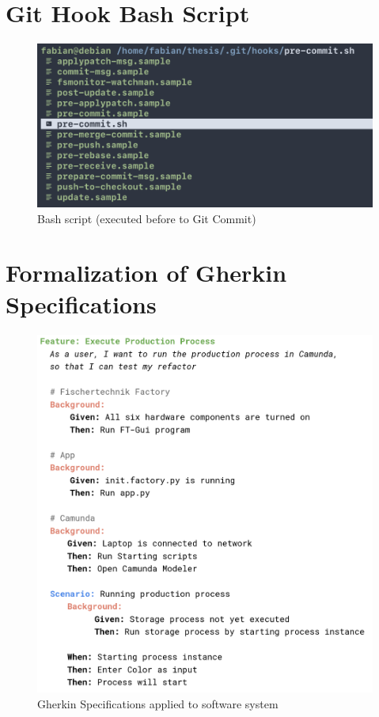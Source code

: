 \chapter{Git Hook Bash Script}
\begin{figure}[htp]
    \centering
    \includegraphics[width=1\columnwidth]{./latex/appendix/placeholder}
    \caption{Bash script (executed before to Git Commit)}
    \label{fig:bash}
\end{figure}

\newpage



\chapter{Formalization of Gherkin Specifications}
\newpage

\begin{figure}[htp]
    \centering
    \includegraphics[width=0.7\columnwidth]{./latex/appendix/gherkin}
    \caption{Gherkin Specifications applied to software system}
    \label{appendix:gherkin}
\end{figure}

